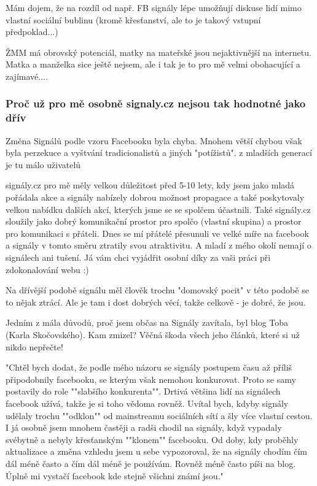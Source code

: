 Mám dojem, že na rozdíl od např. FB signály lépe umožňují diskuse lidí mimo vlastní sociální bublinu (kromě křesťanství, ale to je takový vstupní předpoklad...)

ŽMM má obrovský potenciál, matky na mateřské jsou nejaktivnější na internetu. Matka a manželka sice ještě nejsem, ale i tak je to pro mě velmi obohacující a zajímavé....

\subsubsection{Proč už pro mě osobně signaly.cz nejsou tak hodnotné jako dřív}

Změna Signálů podle vzoru Facebooku byla chyba. Mnohem větší chybou však byla perzekuce a vyštvání tradicionalistů a jiných "potížistů".
z mladších generací je tu málo uživatelů

signály.cz pro mě měly velkou důležitost před 5-10 lety, kdy jsem jako mladá pořádala akce a signály nabízely dobrou možnost propagace a také poskytovaly velkou nabídku dalších akcí, kterých jsme se se spolčem účastnili. Také signály.cz sloužily jako dobrý komunikační prostor pro spolčo (vlastní skupina) a prostor pro komunikaci s přáteli. Dnes se mí přátelé přesunuli ve velké míře na facebook a signály v tomto směru ztratily svou atraktivitu. A mladí z mého okolí nemají o signálech ani tušení. Já vám chci vyjádřit osobní díky za vaši práci při zdokonalování webu :)

Na dřívější podobě signálu měl člověk trochu "domovský pocit" v této podobě se to nějak ztrácí. Ale je tam i dost dobrých věcí, takže celkově - je dobré, že jsou.

Jedním z mála důvodů, proč jsem občas na Signály zavítala, byl blog Toba (Karla Skočovského). Kam zmizel? Věčná škoda všech jeho článků, které si už nikdo nepřečte!

"Chtěl bych dodat, že podle mého názoru se signály postupem času až příliš připodobnily facebooku, se kterým však nemohou konkurovat. Proto se samy postavily do role ""slabšího konkurenta"". Drtivá většina lidí na signálech facebook užívá, takže je si toho vědoma rovněž. Uvítal bych, kdyby signály udělaly trochu ""odklon"" od mainstreamu sociálních sítí a šly více vlastní cestou.
I já osobně jsem mnohem častěji a radši chodil na signály, když vypadaly svébytně a nebyly křesťanským ""klonem"" facebooku. Od doby, kdy proběhly aktualizace a změna vzhledu jsem u sebe vypozoroval, že na signály chodím čím dál méně často a čím dál méně je používám. Rovněž méně často píši na blog. Úplně mi vystačí facebook kde stejně všichni známí jsou."

